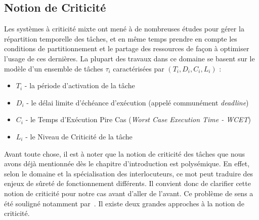 \documentclass[french, a4paper, 11pt, twoside, pdftex]{StyleThese}
\begin{document}
    
    \subsection{Notion de Criticité}
    	
    Les systèmes à criticité mixte ont mené à de nombreuses études pour gérer la répartition temporelle des tâches, et en même temps prendre en compte les conditions de partitionnement et le partage des ressources de façon à optimiser l'usage de ces dernières. La plupart des travaux dans ce domaine se basent sur le modèle d'un ensemble de tâches $\tau_i$ caractérisées par $ (T_i,D_i,C_i,L_i) $ : 
    \begin{itemize}
    	\item $T_i$ - la période d'activation de la tâche
    	\item $D_i$ - le délai limite d'échéance d'exécution (appelé communément \textit{deadline})
    	\item $C_i$ - le Temps d'Exécution Pire Cas (\emph{Worst Case Execution Time - WCET})
    	\item $L_i$ - le Niveau de Criticité de la tâche
    \end{itemize}
     
    Avant toute chose, il est à noter que la notion de criticité des tâches que nous avons déjà mentionnée dès le chapitre d'introduction est polysémique. En effet, selon le domaine et la spécialisation des interlocuteurs, ce mot peut traduire des enjeux de sûreté de fonctionnement différents. Il convient donc de clarifier cette notion de criticité pour notre cas avant d'aller de l'avant. Ce problème de sens a été souligné notamment par~\cite{graydon_safety_2013}. Il existe deux grandes approches à la notion de criticité. 
    
\end{document}

